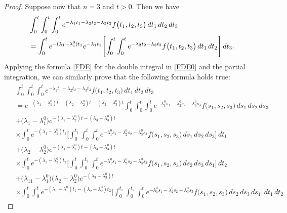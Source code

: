 \documentclass{amsart}
\theoremstyle{definition}
\theoremstyle{remark}
\numberwithin{equation}{section}
\begin{document}
\begin{proof}
Suppose now that $n=3 $ and $t>0.$ Then we have
\begin{align}
& \notag \int^{t}_{0}\int^{t}_{0}\int^{t}_{0}e^{-\lambda_{1}t_{1}-\lambda_{2}t_{2}-\lambda_{3}t_{3}}f\bigl( t_{1},t_{2},t_{3}\bigr)\, dt_{1}\, dt_{2}\, dt_{3}
\\\label{FDE0}& =\int^{t}_{0}e^{-(\lambda_{1}-\lambda_{1}^{0})t_{1}}e^{-\lambda_{1}t_{1}}\Biggl[ \int^{t}_{0}\int^{t}_{0}e^{-\lambda_{2}t_{2}-\lambda_{3}t_{3}}f\bigl( t_{1},t_{2},t_{3}\bigr)\, dt_{1}\, dt_{2} \Biggr]\, dt_{3}.
\end{align}
Applying the formula \eqref{FDE} for the double integral in \eqref{FDE0} and the partial integration, we can similarly prove that the following formula holds true: {\small
\begin{align}\label{FDE1}
\begin{split}
& \int^{t}_{0}\int^{t}_{0}\int^{t}_{0}e^{-\lambda_{1}t_{1}-\lambda_{2}t_{2}-\lambda_{3}t_{3}}f\bigl( t_{1},t_{2},t_{3}\bigr)\, dt_{1}\, dt_{2}\, dt_{3}
\\& =e^{-(\lambda_{1}-\lambda_{1}^{0})t-(\lambda_{2}-\lambda_{2}^{0})t-(\lambda_{3}-\lambda_{3}^{0})t}\int^{t}_{0}\int^{t}_{0}\int^{t}_{0}e^{-\lambda_{1}^{0}s_{1}-\lambda_{2}^{0}s_{2}-\lambda_{3}^{0}s_{3}}f\bigl( s_{1},s_{2},s_{3}\bigr)\, ds_{1}\, ds_{2} \, ds_{3}
\\& +\bigl( \lambda_{1}-\lambda_{1}^{0}\bigr)e^{-(\lambda_{2}-\lambda_{2}^{0})t-(\lambda_{3}-\lambda_{3}^{0})t}
\\& \times \int^{t}_{0}e^{-(\lambda_{1}-\lambda_{1}^{0})t_{1}}\Biggl[\int^{t_{1}}_{0}\int^{t}_{0}\int^{t}_{0}e^{-\lambda_{1}^{0}s_{1}-\lambda_{2}^{0}s_{2}-\lambda_{3}^{0}s_{3}}f\bigl( s_{1},s_{2},s_{3}\bigr)\, ds_{1}\, ds_{2} \, ds_{3} \Biggr]\, dt_{1}
\\& +\bigl( \lambda_{2}-\lambda_{2}^{0}\bigr)e^{-(\lambda_{1}-\lambda_{1}^{0})t-(\lambda_{3}-\lambda_{3}^{0})t}
\\& \times \int^{t}_{0}e^{-(\lambda_{2}-\lambda_{2}^{0})t_{2}}\Biggl[ \int^{t}_{0}\int^{t_{2}}_{0}\int^{t}_{0}e^{-\lambda_{1}^{0}s_{1}-\lambda_{2}^{0}s_{2}-\lambda_{3}^{0}s_{3}}f\bigl( s_{1},s_{2},s_{3}\bigr)\, ds_{2} \, ds_{3}\, ds_{1} \Biggr]\, dt_{2}
\\& +\bigl( \lambda_{11}-\lambda_{1}^{0}\bigr)\bigl( \lambda_{2}-\lambda_{2}^{0}\bigr)e^{-(\lambda_{3}-\lambda_{3}^{0})t}
\\& \times \int^{t}_{0} \int^{t}_{0}e^{-(\lambda_{1}-\lambda_{1}^{0})t_{1}-(\lambda_{2}-\lambda_{2}^{0})t_{2}}\Biggl[ \int^{t_{1}}_{0}\int^{t_{2}}_{0}\int^{t}_{0}e^{-\lambda_{1}^{0}s_{1}-\lambda_{2}^{0}s_{2}-\lambda_{3}^{0}s_{3}}f\bigl( s_{1},s_{2},s_{3}\bigr)\, ds_{2} \, ds_{3}\, ds_{1} \Biggr]\, dt_{1}\, dt_{2}

\end{split}
\end{align}}
\end{proof}
\end{document}
